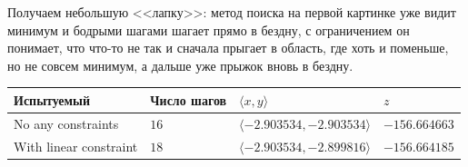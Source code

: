 \documentclass[12pt, a4paper, oneside, final]{article}
\begin{document}
	Получаем небольшую <<лапку>>: метод поиска на первой картинке уже видит минимум и бодрыми шагами шагает прямо в бездну, с ограничением он понимает, что что-то не так и сначала прыгает в область, где хоть и поменьше, но не совсем минимум, а дальше  уже прыжок вновь в бездну.
	\begin{table}[H]
		\centering
		\begin{tabular}{l|l|l|l}
			Испытуемый & Число шагов & $\langle x, y \rangle$ & $z$ \\ \hline
			No any constraints & $16$ & $\langle-2.903534,  -2.903534 \rangle$ & $-156.664663$ \\
			With linear constraint & $18$ & $\langle -2.903534,  -2.899816 \rangle$ & $-156.664185$
		\end{tabular}
	\end{table}
\end{document}
